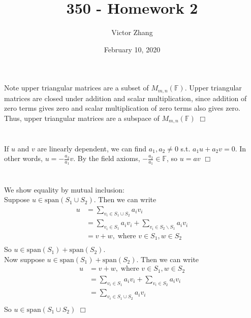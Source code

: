 \documentclass{article}
\title{350 - Homework 2}
\author{Victor Zhang }
\date{February 10, 2020}
\begin{document}
\maketitle

\section{}
Note upper triangular matrices are a subset of $M_{m,n}(\mathbb{F})$. Upper triangular matrices are closed under addition and scalar multiplication, since addition of zero terms gives zero and scalar multiplication of zero terms also gives zero. Thus, upper triangular matrices are a subspace of $M_{m,n}(\mathbb{F})$ $\Box$

\section{}
If $u$ and $v$ are linearly dependent, we can find $a_1,a_2\neq 0$ s.t. $a_1u + a_2v = 0$. In other words, $u = -\frac{a_2}{a_1}v$. By the field axioms, $-\frac{a_2}{a_1} \in \mathbb{F}$, so $u = av$ $\Box$

\section{}
We show equality by mutual inclusion:\\
Suppose $u\in \mathrm{span}(S_1 \cup S_2)$. Then we can write
\begin{equation*}
    \begin{split}
    u &= \sum\limits_{v_i \in S_1 \cup S_2} a_i v_i\\
    &= \sum\limits_{v_i \in S_1}a_i v_i + \sum\limits_{v_i \in S_2 \backslash S_1} a_i v_i\\
    &= v + w,\; \text{where } v\in S_1, w \in S_2\\
    \end{split}
\end{equation*}
So $u \in \mathrm{span}(S_1) + \mathrm{span}(S_2)$.\\
Now suppose $u\in \mathrm{span}(S_1) + \mathrm{span}(S_2)$. Then we can write
\begin{equation*}
    \begin{split}
    u &= v + w,\; \text{where } v\in S_1, w\in S_2\\
    &= \sum\limits_{v_i \in S_1} a_i v_i + \sum\limits_{v_i \in S_2} a_i v_i\\
    &= \sum\limits_{v_i \in S_1 \cup S_2} a_i v_i\\
    \end{split}
\end{equation*}
So $u \in \mathrm{span}(S_1 \cup S_2)$ $\Box$
\end{document}
